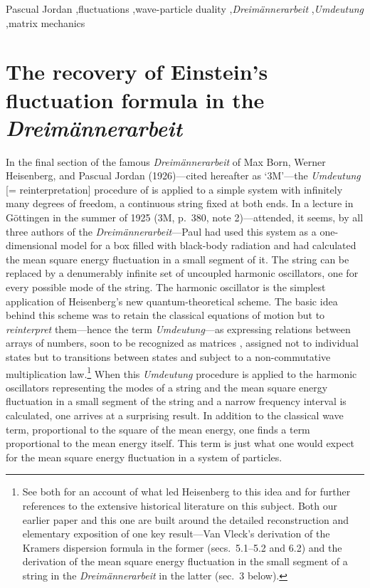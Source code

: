 \documentclass{elsart}
\begin{document}
\begin{frontmatter}
\begin{keyword}
Pascual Jordan \sep fluctuations \sep wave-particle duality \sep {\it Dreim\"annerarbeit} \sep  {\it Umdeutung}  \sep matrix mechanics
\end{keyword}

\end{frontmatter}


\section{The recovery of Einstein's fluctuation formula in the {\it Drei\-m\"anner\-arbeit}}

In the final section of the famous {\it Dreim\"annerarbeit} of Max Born, Werner Heisenberg, and Pascual Jordan (1926)---cited hereafter as `3M'---the {\it Umdeutung} [= reinterpretation] procedure of \citep{Heisenberg 1925} is applied to a simple system with infinitely many degrees of freedom, a continuous string fixed at both ends. In a lecture in G\"ottingen in the summer of 1925 (3M, p.\ 380, note 2)---attended, it seems, by all three authors of the  {\it Dreim\"annerarbeit}---Paul \citet{Ehrenfest 1925a} had used this system as a one-dimensional model for a box filled with black-body radiation and had calculated the mean square energy fluctuation in a small segment of it. The string can be replaced by a denumerably infinite set of uncoupled harmonic oscillators, one for every possible mode of the string. The harmonic oscillator is the simplest application of Heisenberg's new quantum-theoretical scheme. The basic idea behind this scheme was to retain the classical equations of motion but to {\it reinterpret} them---hence the term {\it Umdeutung}---as expressing relations between arrays of numbers, soon to be recognized as matrices \citep{Born and Jordan 1925}, assigned not to individual states but to transitions between states and subject to a non-commutative multiplication law.\footnote{See \citep{Duncan and Janssen} both for an account of what led Heisenberg to this idea and for further references to the extensive historical literature on this subject. Both our earlier paper and this one are built around the detailed reconstruction and elementary exposition of one key result---Van Vleck's derivation of the Kramers dispersion formula in the former (secs.\ 5.1--5.2 and 6.2) and the derivation of the mean square energy fluctuation in the small segment of a string in the {\it Dreim\"annerarbeit} in the latter (sec.\ 3 below).} When this {\it Umdeutung} procedure is applied to the harmonic oscillators representing the modes of a string and the mean square energy fluctuation in a small segment of the string and a narrow frequency interval is calculated, one arrives at a surprising result. In addition to the classical wave term, proportional to the square of the mean energy, one finds a term proportional to the mean energy itself. This term is just what one would expect  for the mean square energy fluctuation in a system of particles.
\end{document}
